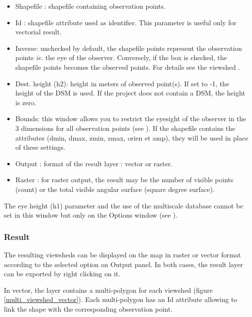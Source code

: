 \documentclass{report}
\begin{document}
\begin{itemize}
	\item Shapefile : shapefile containing observation points.
	\item Id : shapefile attribute used as identifier. This parameter is useful only for vectorial result.
	\item Inverse: unchecked by default, the shapefile points represent the observation points \textit{ie.} the eye of the observer. Conversely, if the box is checked, the shapefile points becomes the observed points. For details see the viewshed .
	\item Dest. height (h2): height in meters of observed point(s). If set to -1, the height of the DSM is used. If the project does not contain a DSM, the height is zero.
	\item Bounds: this window allows you to restrict the eyesight of the observer in the 3 dimensions for all observation points (see ). If the shapefile contains the attributes (dmin, dmax, zmin, zmax, orien et amp), they will be used in place of these settings.
	\item Output : format of the result layer : vector or raster.
	\item Raster : for raster output, the result may be the number of visible points (count) or the total visible angular surface (square degree surface).
\end{itemize}

The eye height (h1) parameter and the use of the multiscale database cannot be set in this window but only on the Options window (see ).

\subsubsection{Result}
The resulting viewsheds can be displayed on the map in raster or vector format according to the selected option on Output panel. In both cases, the result layer can be exported by right clicking on it.

In vector, the layer contains a multi-polygon for each viewshed (figure \ref{multi_viewshed_vector}). Each multi-polygon has an Id attribute allowing to link the shape with the corresponding observation point.
\end{document}
